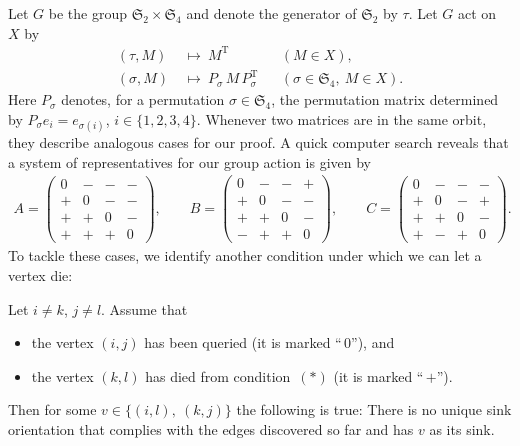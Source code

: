 \documentclass[runningheads,a4paper]{llncs}
\newcommand{\Sym}{\ensuremath{\mathfrak{S}}}
\newcommand{\T}{\ensuremath{\mathrm{T}}}
\begin{document}
Let $G$ be the group $\Sym_2 \times \Sym_4$ and denote the generator of
$\Sym_2$ by $\tau$.
Let $G$ act on $X$ by
\begin{align*}
    (\tau,M) ~&\mapsto~ M^\T   && (M \in X),
    \\
    (\sigma,M) ~&\mapsto~ P_\sigma \, M \, P_\sigma^\T
            && (\sigma \in \Sym_4,~ M \in X).
\end{align*}
Here $P_\sigma$ denotes, for a permutation $\sigma \in \Sym_4$, the
permutation matrix determined by $P_\sigma e_i = e_{\sigma(i)}$, $i \in
\{1,2,3,4\}$.
Whenever two matrices are in the same orbit, they describe analogous cases for
our proof.
A quick computer search reveals that a system of representatives for our group
action is given by
\begin{align*}
    A =
        \begin{pmatrix}
            0 & - & - & -
            \\
            + & 0 & - & -
            \\
            + & + & 0 & -
            \\
            + & + & + & 0
        \end{pmatrix},
    \qquad
    B =
        \begin{pmatrix}
            0 & - & - & +
            \\
            + & 0 & - & -
            \\
            + & + & 0 & -
            \\
            - & + & + & 0
        \end{pmatrix},
    \qquad
    C =
        \begin{pmatrix}
            0 & - & - & -
            \\
            + & 0 & - & +
            \\
            + & + & 0 & -
            \\
            + & - & + & 0
        \end{pmatrix}.
\end{align*}
To tackle these cases, we identify another condition under which we can let a
vertex die:

\begin{lemma}
    \label{lem:kill}
    Let $i \neq k$, $j \neq l$.
    Assume that
    \begin{itemize}
        \item the vertex $(i,j)$ has been queried (it is marked ``\,$0$''), and
        \item the vertex $(k,l)$ has died from condition~$(*)$ (it is marked
            ``\,$+$'').
    \end{itemize}
    Then for some $v \in \{ (i,l),~ (k,j) \}$ the following is true:
    There is no unique sink orientation that complies with the edges
    discovered so far and has $v$ as its sink.
\end{lemma}
\end{document}
